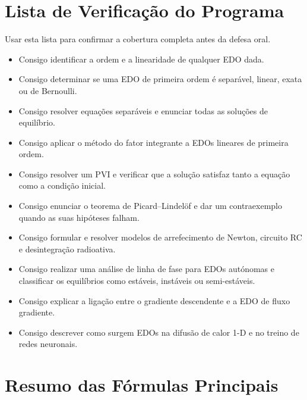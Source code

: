 \section{Lista de Verificação do Programa}
\label{sec:checklist5}

\begin{tcolorbox}[
  colback=soft, colframe=primary,
  title={\textbf{Lista de Competências}},
  fonttitle=\bfseries\color{white},
  attach boxed title to top left={yshift=-2mm, xshift=4mm},
  boxed title style={colback=primary, rounded corners, size=small}
]
  Usar esta lista para confirmar a cobertura completa antes da defesa oral.

  \begin{itemize}[label=\textcolor{primary}{$\square$}, leftmargin=1.5em]
    \item Consigo identificar a ordem e a linearidade de qualquer EDO dada.
    \item Consigo determinar se uma EDO de primeira ordem é separável, linear, exata ou
          de Bernoulli.
    \item Consigo resolver equações separáveis e enunciar todas as soluções de equilíbrio.
    \item Consigo aplicar o método do fator integrante a EDOs lineares de primeira ordem.
    \item Consigo resolver um PVI e verificar que a solução satisfaz tanto a equação como
          a condição inicial.
    \item Consigo enunciar o teorema de Picard--Lindel\"of e dar um contraexemplo quando
          as suas hipóteses falham.
    \item Consigo formular e resolver modelos de arrefecimento de Newton, circuito RC e
          desintegração radioativa.
    \item Consigo realizar uma análise de linha de fase para EDOs autónomas e classificar
          os equilíbrios como estáveis, instáveis ou semi-estáveis.
    \item Consigo explicar a ligação entre o gradiente descendente e a EDO de fluxo
          gradiente.
    \item Consigo descrever como surgem EDOs na difusão de calor 1-D e no treino de redes
          neuronais.
  \end{itemize}
\end{tcolorbox}

\section{Resumo das Fórmulas Principais}
\label{sec:formulas5}

